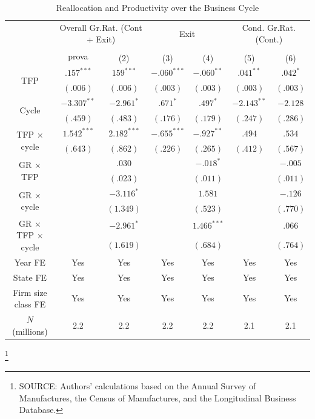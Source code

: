 \documentclass[12pt]{article}
\begin{document}
 \begin{table}[ht]
    \centering
    \caption{Reallocation and Productivity over the Business Cycle}
    \begin{tabular}{|c|c c c c c c|}
    \hline & \multicolumn{2}{c|}{Overall Gr.Rat. (Cont + Exit)} & \multicolumn{2}{c|}{Exit} &
    \multicolumn{2}{c|}{Cond. Gr.Rat.(Cont.)} \\
    & \multirow{2}{*}{prova}\\
    \hline & (1) & (2) & (3) & (4) & (5) & (6) \\
     \multirow{2}{*}{TFP} & $.157^{***}$ & $159^{***}$ & $-.060^{***}$ & $-.060^{**}$ & $.041^{**}$ & $.042^{*}$ \\
    & $(.006)$ & $(.006)$ & $(.003)$ & $(.003)$ & $(.003)$ & $(.003)$ \\
     \multirow{2}{*}{Cycle} & $-3.307^{**}$ & $-2.961^{*}$ & $.671^{*}$ & $.497^{*}$ & $-2.143^{**}$ & $-2.128$ \\
    & $(.459)$ & $(.483)$ & $(.176)$ & $(.179)$ & $(.247)$ & $(.286)$ \\
     \multirow{2}{*}{TFP $\times$ cycle} & $1.542^{***}$ & $2.182^{***}$ & $-.655^{***}$ & $-.927^{**}$ & $.494$ & $.534$ \\
    & $(.643)$ & $(.862)$ & $(.226)$ & $(.265)$ & $(.412)$ & $(.567)$ \\
     \multirow{2}{*}{GR $\times$ TFP} & & $.030$ & & $-.018^{*}$ & & $-.005$ \\
    & & $(.023)$ & & $(.011)$ & & $(.011)$ \\
     \multirow{2}{*}{GR $\times$ cycle} & & $-3.116^{*}$ & & $1.581$ & & $-.126$ \\
    & & $(1.349)$ & & $(.523)$ & & $(.770)$ \\
     \multirow{2}{*}{GR $\times$ TFP $\times$ cycle} & & $-2.961^{*}$ & & $1.466^{***}$ & & $.066$ \\
    & & $(1.619)$ & & $(.684)$ & & $(.764)$ \\
    \hline Year FE & Yes & Yes & Yes & Yes & Yes & Yes \\
     State FE & Yes & Yes & Yes & Yes & Yes & Yes \\
     Firm size class FE & Yes & Yes & Yes & Yes & Yes & Yes \\
     $N$ (millions) & 2.2 & 2.2 & 2.2 & 2.2 & 2.1 & 2.1 \\
    \hline
    \end{tabular}
    \footnote{SOURCE: Authors' calculations based on the Annual Survey of Manufactures, the Census of Manufactures, and the Longitudinal Business Database.}

\end{table}
\end{document}
